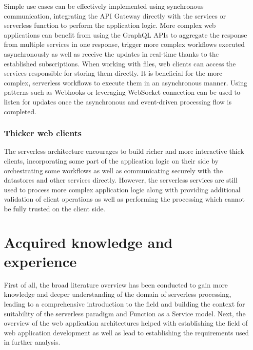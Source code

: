 Simple use cases can be effectively implemented using synchronous communication, integrating the API Gateway directly with the services or serverless function to perform the application logic.
More complex web applications can benefit from using the GraphQL APIs to aggregate the response from multiple services in one response, trigger more complex workflows executed asynchronously as well as receive the updates in real-time thanks to the established subscriptions.
When working with files, web clients can access the services responsible for storing them directly.
It is beneficial for the more complex, serverless workflows to execute them in an asynchronous manner.
Using patterns such as Webhooks or leveraging WebSocket connection can be used to listen for updates once the asynchronous and event-driven processing flow is completed.



\subsubsection{Thicker web clients}

The serverless architecture encourages to build richer and more interactive thick clients, incorporating some part of the application logic on their side by orchestrating some workflows as well as communicating securely with the datastores and other services directly.
However, the serverless services are still used to process more complex application logic along with providing additional validation of client operations as well as performing the processing which cannot be fully trusted on the client side.

\section{Acquired knowledge and experience}

First of all, the broad literature overview has been conducted to gain more knowledge and deeper understanding of the domain of serverless processing, leading to a comprehensive introduction to the field and building the context for suitability of the serverless paradigm and Function as a Service model.
Next, the overview of the web application architectures helped with establishing the field of web application development as well as lead to establishing the requirements used in further analysis.

